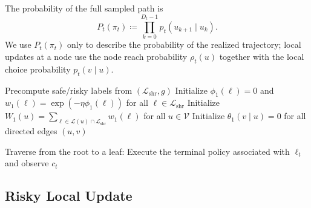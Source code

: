 \documentclass{article}
\begin{document}
The probability of the full sampled path is
\begin{equation}
    P_t(\pi_t) \coloneqq \prod_{k=0}^{D_t-1} p_t(u_{k+1}\mid u_k).
    \label{eq:path_prob}
\end{equation}
We use $P_t(\pi_t)$ only to describe the probability of the realized trajectory; local updates at a node use the node reach probability $\rho_t(u)$ together with the local choice probability $p_t(v\mid u)$.

\begin{algorithm}[t]
\caption{\textsc{BarrierShare}}
\label{alg:barriershare}

Precompute safe/risky labels from $(\mathcal{L}_{\mathrm{shr}}, g)$\;
Initialize $\phi_1(\ell)=0$ and $w_1(\ell)=\exp(-\eta \phi_1(\ell))$ for all $\ell\in\mathcal{L}_{\mathrm{shr}}$\;
Initialize $W_1(u)=\sum_{\ell\in\mathcal{L}(u)\cap \mathcal{L}_{\mathrm{shr}}} w_1(\ell)$ for all $u\in\mathcal{V}$\;
Initialize $\theta_1(v\mid u)=0$ for all directed edges $(u,v)$\;

Traverse from the root to a leaf:\;
Execute the terminal policy associated with $\ell_t$ and observe $c_t$\;


\end{algorithm}

\subsection{Risky Local Update}
\label{sec:barriershare_risky_update}
\end{document}
